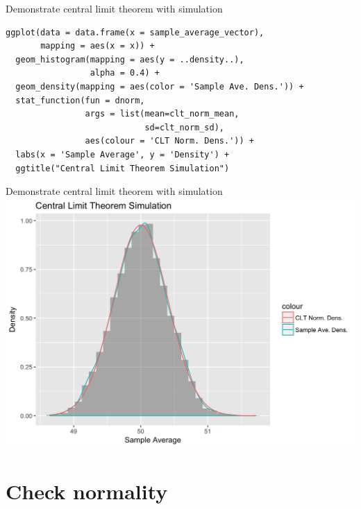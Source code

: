 \documentclass[12pt, t, xcolor=dvipsnames]{beamer}
\begin{document}
\begin{frame}[fragile]{Demonstrate central limit theorem with simulation}

\begin{verbatim}
ggplot(data = data.frame(x = sample_average_vector), 
       mapping = aes(x = x)) +
  geom_histogram(mapping = aes(y = ..density..), 
                 alpha = 0.4) +
  geom_density(mapping = aes(color = 'Sample Ave. Dens.')) +
  stat_function(fun = dnorm, 
                args = list(mean=clt_norm_mean, 
                            sd=clt_norm_sd), 
                aes(colour = 'CLT Norm. Dens.')) + 
  labs(x = 'Sample Average', y = 'Density') + 
  ggtitle("Central Limit Theorem Simulation")
\end{verbatim}

\end{frame}


\begin{frame}{Demonstrate central limit theorem with simulation}
  \includegraphics[height=\textheight, keepaspectratio]{cltsim}
\end{frame}


\section{Check normality}
\end{document}
